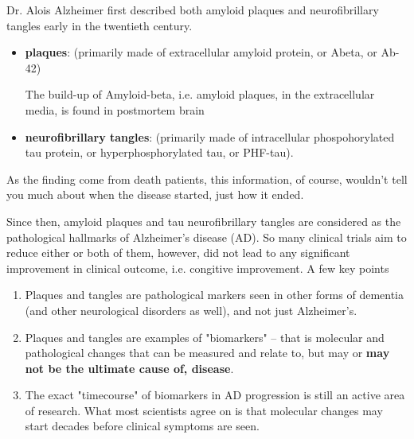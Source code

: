 Dr. Alois Alzheimer first described both amyloid plaques and neurofibrillary
tangles early in the twentieth century.

\begin{itemize}

  \item {\bf plaques}: (primarily made of extracellular amyloid protein, or Abeta, or Ab-42) 

The build-up of Amyloid-beta, i.e. amyloid plaques, in the extracellular
media, is found in postmortem brain

  \item {\bf neurofibrillary tangles}: (primarily made of intracellular
  phospohorylated tau protein, or hyperphosphorylated tau, or PHF-tau).
\end{itemize}

As the finding come from death patients, this information, of course, wouldn't
tell you much about when the disease started, just how it ended.


Since then, amyloid plaques and tau neurofibrillary tangles are considered as
the pathological hallmarks of Alzheimer's disease (AD). So many clinical trials
aim to reduce either or both of them, however, did not lead to any significant
improvement in clinical outcome, i.e. congitive improvement. 
A few key points
\begin{enumerate}
  
  \item  Plaques and tangles are pathological markers seen in other forms of
  dementia (and other neurological disorders as well), and not just Alzheimer's.

  \item Plaques and tangles are examples of "biomarkers" -- that is molecular
  and pathological changes that can be measured and relate to, but may or {\bf may
  not be the ultimate cause of, disease}.
  
  
  \item The exact "timecourse" of biomarkers in AD progression is still an 
  active area of research. What most scientists agree on is that  molecular
  changes may start decades before clinical symptoms are seen.
  
\end{enumerate}


